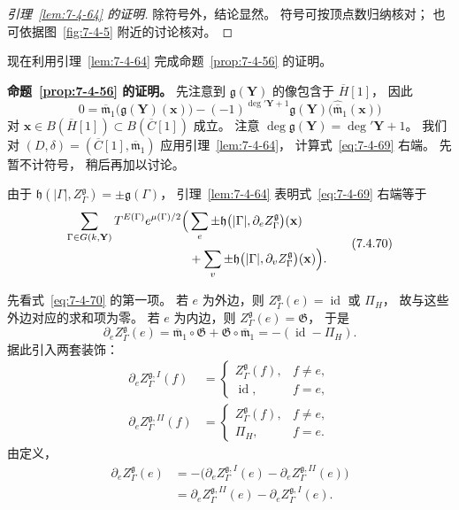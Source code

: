 
\begin{proof}[引理~\ref{lem:7-4-64} 的证明]
除符号外，结论显然。
符号可按顶点数归纳核对；
也可依据图~\ref{fig:7-4-5}
附近的讨论核对。
\end{proof}

现在利用引理~\ref{lem:7-4-64}
完成命题~\ref{prop:7-4-56}
的证明。

\par\noindent\textbf{命题~\ref{prop:7-4-56} 的证明。}
先注意到
$\mathfrak g(\mathbf Y)$
的像包含于 $\overline H[1]$，
因此
\begin{equation}
0=
\overline{\mathfrak m}_1
\bigl(\mathfrak g(\mathbf Y)(\mathbf x)\bigr)
-(-1)^{\deg'\mathbf Y+1}
\mathfrak g(\mathbf Y)
\bigl(
\widehat{\overline{\mathfrak m}}_1(\mathbf x)
\bigr)
\tag{7.4.69}\label{eq:7-4-69}
\end{equation}
对
$\mathbf x\in B(\overline H[1])
\subset B(\overline C[1])$
成立。
注意
$\deg\mathfrak g(\mathbf Y)
=\deg'\mathbf Y+1$。
我们对
$(D,\delta)
=(\overline C[1],\overline{\mathfrak m}_1)$
应用引理~\ref{lem:7-4-64}，
计算式~\eqref{eq:7-4-69}
右端。
先暂不计符号，
稍后再加以讨论。

由于
$\mathfrak h(|\Gamma|,
Z_\Gamma^{\mathfrak g})
=\pm\mathfrak g(\Gamma)$，
引理~\ref{lem:7-4-64}
表明式~\eqref{eq:7-4-69}
右端等于
\begin{equation}
\begin{aligned}
\sum_{\Gamma\in G(k,\mathbf Y)}
T^{E(\Gamma)}e^{\mu(\Gamma)/2}
\Bigl(
&\sum_e\pm
\mathfrak h\bigl(
|\Gamma|,\partial_e
Z_\Gamma^{\mathfrak g}
\bigr)(\mathbf x)\\
&+
\sum_v\pm
\mathfrak h\bigl(
|\Gamma|,\partial_v
Z_\Gamma^{\mathfrak g}
\bigr)(\mathbf x)
\Bigr).
\end{aligned}
\tag{7.4.70}\label{eq:7-4-70}
\end{equation}

先看式~\eqref{eq:7-4-70}
的第一项。
若 $e$ 为外边，则
$Z_\Gamma^{\mathfrak g}(e)
=\operatorname{id}$ 或 $\Pi_H$，
故与这些外边对应的求和项为零。
若 $e$ 为内边，则
$Z_\Gamma^{\mathfrak g}(e)
=\mathfrak G$，
于是
\[
\partial_e
Z_\Gamma^{\mathfrak g}(e)
=\overline{\mathfrak m}_1\circ\mathfrak G
+\mathfrak G\circ\overline{\mathfrak m}_1
=-(\operatorname{id}-\Pi_H).
\]
据此引入两套装饰：
\[
\begin{aligned}
\partial_e Z_\Gamma^{\mathfrak g,I}(f)
&=
\begin{cases}
Z_\Gamma^{\mathfrak g}(f),
&f\ne e,\\
\operatorname{id},
&f=e,
\end{cases}
\\[0.6ex]
\partial_e Z_\Gamma^{\mathfrak g,II}(f)
&=
\begin{cases}
Z_\Gamma^{\mathfrak g}(f),
&f\ne e,\\
\Pi_H,
&f=e.
\end{cases}
\end{aligned}
\]
由定义，
\[
\begin{aligned}
\partial_e Z_\Gamma^{\mathfrak g}(e)
&=-\bigl(
\partial_e Z_\Gamma^{\mathfrak g,I}(e)
-\partial_e Z_\Gamma^{\mathfrak g,II}(e)
\bigr)\\
&=
\partial_e Z_\Gamma^{\mathfrak g,II}(e)
-\partial_e Z_\Gamma^{\mathfrak g,I}(e).
\end{aligned}
\]

